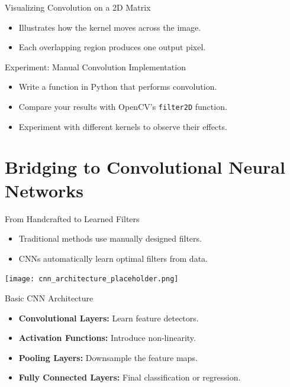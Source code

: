 \documentclass{beamer}
\begin{document}
\begin{frame}{Visualizing Convolution on a 2D Matrix}
  \begin{center}
  \end{center}
  \begin{itemize}
    \item Illustrates how the kernel moves across the image.
    \item Each overlapping region produces one output pixel.
  \end{itemize}
\end{frame}

\begin{frame}{Experiment: Manual Convolution Implementation}
  \begin{itemize}
    \item Write a function in Python that performs convolution.
    \item Compare your results with OpenCV's \texttt{filter2D} function.
    \item Experiment with different kernels to observe their effects.
  \end{itemize}
\end{frame}

\section{Bridging to Convolutional Neural Networks}

\begin{frame}{From Handcrafted to Learned Filters}
  \begin{itemize}
    \item Traditional methods use manually designed filters.
    \item CNNs automatically learn optimal filters from data.
  \end{itemize}
  \begin{center}
    \texttt{[image: cnn\_architecture\_placeholder.png]} %
  \end{center}
\end{frame}

\begin{frame}{Basic CNN Architecture}
  \begin{itemize}
    \item \textbf{Convolutional Layers:} Learn feature detectors.
    \item \textbf{Activation Functions:} Introduce non-linearity.
    \item \textbf{Pooling Layers:} Downsample the feature maps.
    \item \textbf{Fully Connected Layers:} Final classification or regression.
  \end{itemize}
\end{frame}
\end{document}
